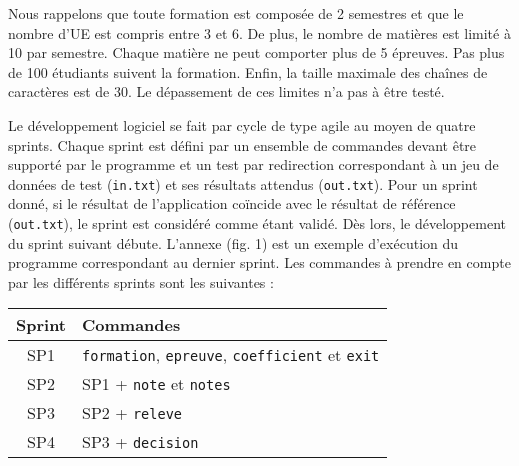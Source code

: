 \documentclass[10pt,a4paper,oneside]{article}
\begin{document}
Nous rappelons que toute formation est composée de 2 semestres et que le nombre d'UE est compris entre 3 et 6. De plus, le nombre de matières est limité à 10 par semestre. Chaque matière ne peut comporter plus de 5 épreuves. Pas plus de 100 étudiants suivent la formation. Enfin, la taille maximale des chaînes de caractères est de 30. Le dépassement de ces limites n'a pas à être testé. 

\medskip

Le développement logiciel se fait par cycle de type agile au moyen de quatre sprints. Chaque sprint est défini par un ensemble de commandes devant être supporté par le programme et un test par redirection correspondant à un jeu de données de test (\texttt{in.txt}) et ses résultats attendus (\texttt{out.txt}). Pour un sprint donné, si le résultat de l'application coïncide avec le résultat de référence (\texttt{out.txt}), le sprint est considéré comme étant validé. Dès lors, le développement du sprint suivant débute. L'annexe (fig. 1) est un exemple d'exécution du programme correspondant au dernier sprint. Les commandes à prendre en compte par les différents sprints sont les suivantes :

\begin{center}
	\begin{tabular}{|c|l|} \hline
		Sprint & Commandes \\ \hline \hline
		SP1 & \texttt{formation}, \texttt{epreuve}, \texttt{coefficient} et \texttt{exit} \\ \hline
		SP2 & SP1 + \texttt{note} et \texttt{notes} \\ \hline
		SP3 & SP2 + \texttt{releve} \\ \hline
		SP4 & SP3 + \texttt{decision} \\ \hline
	\end{tabular}
\end{center}
\end{document}
